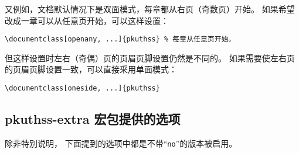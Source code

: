 		又例如，文档默认情况下是双面模式，每章都从右页（奇数页）开始。
		如果希望改成一章可以从任意页开始，可以这样设置：
\begin{Verbatim}[frame = single]
\documentclass[openany, ...]{pkuthss} % 每章从任意页开始。
\end{Verbatim}
		但这样设置时左右（奇偶）页的页眉页脚设置仍然是不同的。
		如果需要使左右页的页眉页脚设置一致，可以直接采用单面模式：
\begin{Verbatim}[frame = single]
% 使用 oneside 选项时不需要再指定 openany 选项。
\documentclass[oneside, ...]{pkuthss}
\end{Verbatim}

		\subsection{pkuthss-extra 宏包提供的选项}\label{ssec:extra}

		除非特别说明，
		下面提到的选项中都是不带“\verb|no|”的版本被启用。

